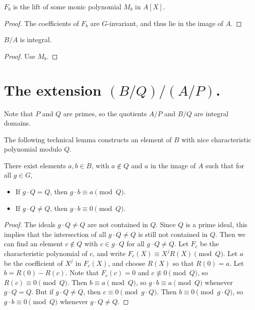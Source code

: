 \begin{lemma}
  \label{Algebra.IsInvariant.charpoly_mem_lifts}
  \mathlibok
  $F_b$ is the lift of some monic polynomial $M_b$ in $A[X]$.
\end{lemma}
\begin{proof}
  \mathlibok
  The coefficients of $F_b$ are $G$-invariant, and thus lie in the image of $A$.
\end{proof}

\begin{theorem}
  \label{Algebra.IsInvariant.isIntegral}
  \mathlibok
  $B/A$ is integral.
\end{theorem}
\begin{proof}
  \mathlibok
  Use $M_b$.
\end{proof}

\section{The extension \texorpdfstring{$(B/Q)/(A/P)$}{(B/Q)/(A/P)}.}

Note that $P$ and $Q$ are primes, so the quotients $A/P$ and $B/Q$ are integral domains.

The following technical lemma constructs an element of $B$ with nice characteristic polynomial
modulo $Q$.

\begin{lemma}
  \label{fixed_of_fixed1_aux1}
  \mathlibok
  There exist elements $a,b \in B$, with $a \notin Q$ and $a$ in the image of $A$ such that
  for all $g\in G$,
  \begin{itemize}
    \item If $g \cdot Q = Q$, then $g \cdot b \equiv a \pmod{Q}$.
    \item If $g \cdot Q \neq Q$, then $g \cdot b \equiv 0 \pmod{Q}$.
  \end{itemize}
\end{lemma}
\begin{proof}
  The ideals $g \cdot Q \neq Q$ are not contained in $Q$.
  Since $Q$ is a prime ideal, this implies that the intersection of all $g \cdot Q \neq Q$ is
  still not contained in $Q$.
  Then we can find an element $c \notin Q$ with $c \in g \cdot Q$ for all $g \cdot Q \neq Q$.
  Let $F_c$ be the characteristic polynomial of $c$, and write $F_c(X) \equiv X^j R(X) \pmod{Q}$.
  Let $a$ be the coefficient of $X^j$ in $F_c(X)$, and choose $R(X)$ so that $R(0) = a$.
  Let $b = R(0) - R(c)$.
  Note that $F_c(c) = 0$ and $c \not\equiv 0 \pmod{Q}$, so $R(c) \equiv 0 \pmod{Q}$.
  Then $b \equiv a \pmod{Q}$, so $g \cdot b \equiv a \pmod{Q}$ whenever $g \cdot Q = Q$.
  But if $g \cdot Q \neq Q$, then $c \equiv 0 \pmod {g \cdot Q}$.
  Then $b \equiv 0 \pmod {g \cdot Q}$, so $g \cdot b \equiv 0 \pmod{Q}$
  whenever $g \cdot Q \neq Q$.
  \mathlibok
\end{proof}

